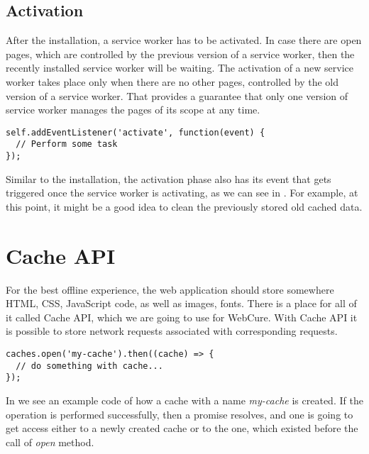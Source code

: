 \subsection*{Activation}

After the installation, a service worker has to be activated. In case there are open pages, which are controlled by the previous version of a service worker, then the recently installed service worker will be waiting. The activation of a new service worker takes place only when there are no other pages, controlled by the old version of a service worker. That provides a guarantee that only one version of service worker manages the pages of its scope at any time.

\begin{lstlisting}[caption={[Code for listening to activation of a Service Worker]Code, which demonstrates a listener for the \textit{activation} service worker's event\cite{32}.}, label={lst:tech4}]
self.addEventListener('activate', function(event) {
  // Perform some task
});
\end{lstlisting}

Similar to the installation, the activation phase also has its event that gets triggered once the service worker is activating, as we can see in . For example, at this point, it might be a good idea to clean the previously stored old cached data.

\section{Cache API}
\label{CacheAPI}

For the best offline experience, the web application should store somewhere HTML, CSS, JavaScript code, as well as images, fonts. There is a place for all of it called Cache API, which we are going to use for WebCure. With Cache API it is possible to store network requests associated with corresponding requests.

\begin{lstlisting}[caption={[Code for creating cache storage using Cache API]Code, which demonstrates how one can create cache storage called \textit{my-cache}\cite{34}.}, label={lst:tech6}]
caches.open('my-cache').then((cache) => {
  // do something with cache...
});
\end{lstlisting}

In  we see an example code of how a cache with a name \textit{my-cache} is created. If the operation is performed successfully, then a promise resolves, and one is going to get access either to a newly created cache or to the one, which existed before the call of \textit{open} method.

